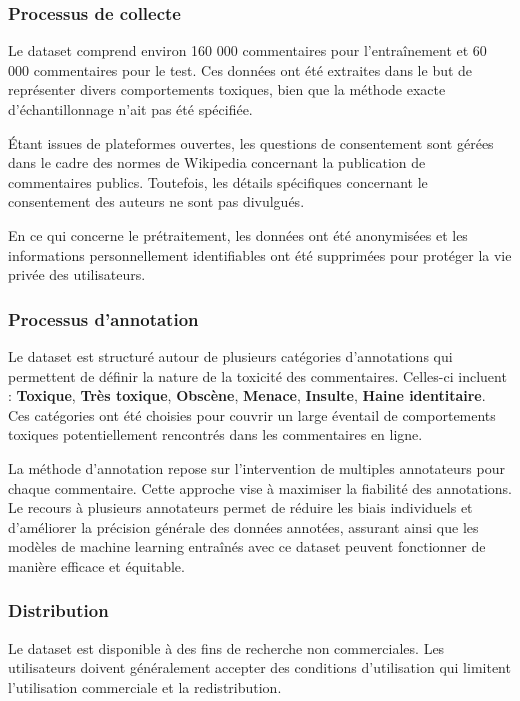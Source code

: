 \newpage
\subsubsection*{Processus de collecte}
Le dataset comprend environ 160 000 commentaires pour l'entraînement et 60 000 commentaires pour le test. Ces données ont été extraites dans le but de représenter divers comportements toxiques, bien que la méthode exacte d'échantillonnage n'ait pas été spécifiée. 

Étant issues de plateformes ouvertes, les questions de consentement sont gérées dans le cadre des normes de Wikipedia concernant la publication de commentaires publics. Toutefois, les détails spécifiques concernant le consentement des auteurs ne sont pas divulgués.

En ce qui concerne le prétraitement, les données ont été anonymisées et les informations personnellement identifiables ont été supprimées pour protéger la vie privée des utilisateurs. 

\subsubsection*{Processus d'annotation}
Le dataset est structuré autour de plusieurs catégories d'annotations qui permettent de définir la nature de la toxicité des commentaires. 
Celles-ci incluent :
\textbf{Toxique},
\textbf{Très toxique},
\textbf{Obscène},
\textbf{Menace},
\textbf{Insulte},
\textbf{Haine identitaire}.
Ces catégories ont été choisies pour couvrir un large éventail de comportements toxiques potentiellement rencontrés dans les commentaires en ligne.

La méthode d'annotation repose sur l'intervention de multiples annotateurs pour chaque commentaire. Cette approche vise à maximiser la fiabilité des annotations.
Le recours à plusieurs annotateurs permet de réduire les biais individuels et d'améliorer la précision générale des données annotées, assurant ainsi que les modèles de machine learning entraînés avec ce dataset peuvent fonctionner de manière efficace et équitable.

\subsubsection*{Distribution}
Le dataset est disponible à des fins de recherche non commerciales. Les utilisateurs doivent généralement accepter des conditions d'utilisation qui limitent l'utilisation commerciale et la redistribution.
